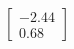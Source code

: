 \documentclass[preview]{standalone}
\begin{document}
\begin{align*}
\begin{bmatrix} -2.44 \\ 0.68 \end{bmatrix}
\end{align*}
\end{document}

